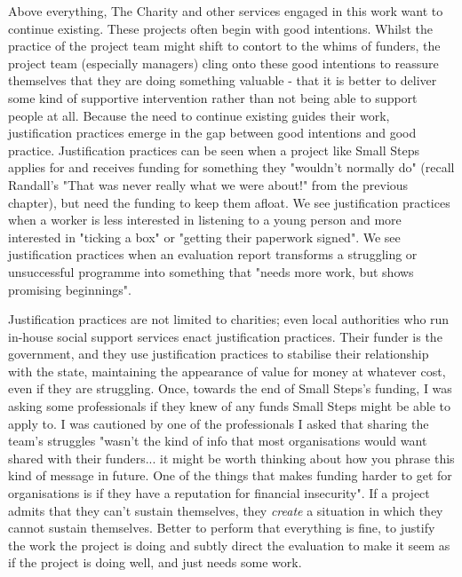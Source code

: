 Above everything, The Charity and other services engaged in this work want to continue existing. These projects often begin with good intentions. Whilst the practice of the project team might shift to contort to the whims of funders, the project team (especially managers) cling onto these good intentions to reassure themselves that they are doing something valuable - that it is better to deliver some kind of supportive intervention rather than not being able to support people at all. Because the need to continue existing guides their work, justification practices emerge in the gap between good intentions and good practice. Justification practices can be seen when a project like Small Steps applies for and receives funding for something they "wouldn't normally do" (recall Randall's "That was never really what we were about!" from the previous chapter), but need the funding to keep them afloat. We see justification practices when a worker is less interested in listening to a young person and more interested in "ticking a box" or "getting their paperwork signed". We see justification practices when an evaluation report transforms a struggling or unsuccessful programme into something that "needs more work, but shows promising beginnings". 

Justification practices are not limited to charities; even local authorities who run in-house social support services enact justification practices. Their funder is the government, and they use justification practices to stabilise their relationship with the state, maintaining the appearance of value for money at whatever cost, even if they are struggling. Once, towards the end of Small Steps's funding, I was asking some professionals if they knew of any funds Small Steps might be able to apply to. I was cautioned by one of the professionals I asked that sharing the team's struggles "wasn't the kind of info that most organisations would want shared with their funders... it might be worth thinking about how you phrase this kind of message in future. One of the things that makes funding harder to get for organisations is if they have a reputation for financial insecurity". If a project admits that they can't sustain themselves, they \emph{create} a situation in which they cannot sustain themselves. Better to perform that everything is fine, to justify the work the project is doing and subtly direct the evaluation to make it seem as if the project is doing well, and just needs some work. 

